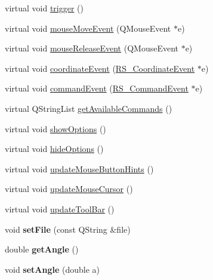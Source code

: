 \begin{DoxyCompactItemize}
\item 
virtual void \hyperlink{classRS__ActionLibraryInsert_a789f957a86dc85f2a497a7fd4fbd0365}{trigger} ()
\item 
virtual void \hyperlink{classRS__ActionLibraryInsert_a55c1c1c8caa218ab1af7ffc4be0a6a5c}{mouse\-Move\-Event} (Q\-Mouse\-Event $\ast$e)
\item 
virtual void \hyperlink{classRS__ActionLibraryInsert_ab7d98bcce20a2ec82424dc0e99efe690}{mouse\-Release\-Event} (Q\-Mouse\-Event $\ast$e)
\item 
virtual void \hyperlink{classRS__ActionLibraryInsert_a14160dc1615f910a2d2bf09afc8afc1b}{coordinate\-Event} (\hyperlink{classRS__CoordinateEvent}{R\-S\-\_\-\-Coordinate\-Event} $\ast$e)
\item 
virtual void \hyperlink{classRS__ActionLibraryInsert_a0f0dc35bca3cbc3143e4feb357afbeae}{command\-Event} (\hyperlink{classRS__CommandEvent}{R\-S\-\_\-\-Command\-Event} $\ast$e)
\item 
virtual Q\-String\-List \hyperlink{classRS__ActionLibraryInsert_ada632995591f785e86a282206ee6437f}{get\-Available\-Commands} ()
\item 
virtual void \hyperlink{classRS__ActionLibraryInsert_acd529fad2ebe0116750f6cedf7833bc0}{show\-Options} ()
\item 
virtual void \hyperlink{classRS__ActionLibraryInsert_a7eef739a490874d6997338a5bed7f938}{hide\-Options} ()
\item 
virtual void \hyperlink{classRS__ActionLibraryInsert_ad0c3fb3377ada2f02065ee09025e398c}{update\-Mouse\-Button\-Hints} ()
\item 
virtual void \hyperlink{classRS__ActionLibraryInsert_acb2a71d8dd02bcd09ff8cf10e4820843}{update\-Mouse\-Cursor} ()
\item 
virtual void \hyperlink{classRS__ActionLibraryInsert_a59bbe0b8af96be9c2ccb927d0264929f}{update\-Tool\-Bar} ()
\item 
\hypertarget{classRS__ActionLibraryInsert_acd9b4e3336739ebd946c91e2f3d7a0af}{void {\bfseries set\-File} (const Q\-String \&file)}\label{classRS__ActionLibraryInsert_acd9b4e3336739ebd946c91e2f3d7a0af}

\item 
\hypertarget{classRS__ActionLibraryInsert_a63d0140bf8708f6c1ee84c2c7c3533ae}{double {\bfseries get\-Angle} ()}\label{classRS__ActionLibraryInsert_a63d0140bf8708f6c1ee84c2c7c3533ae}

\item 
\hypertarget{classRS__ActionLibraryInsert_ac8fb215f4ff4967ebe595b6bbbc6709b}{void {\bfseries set\-Angle} (double a)}\label{classRS__ActionLibraryInsert_ac8fb215f4ff4967ebe595b6bbbc6709b}


\end{DoxyCompactItemize}
